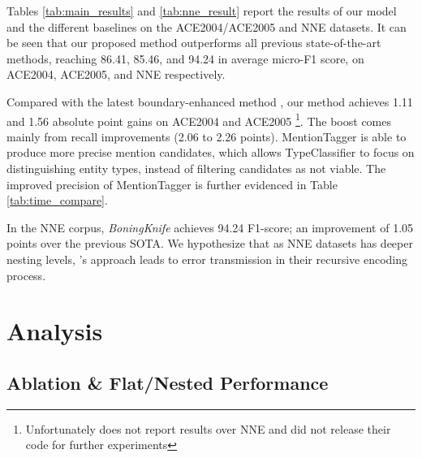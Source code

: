 \documentclass[11pt,a4paper]{article}
\begin{document}
Tables \ref{tab:main_results} and \ref{tab:nne_result} report the results of our model and the different baselines on the ACE2004/ACE2005 and NNE datasets.
It can be seen that our proposed method outperforms all previous state-of-the-art methods, reaching 86.41, 85.46, and 94.24 in average micro-F1 score, on ACE2004, ACE2005, and NNE respectively.

Compared with the latest boundary-enhanced method \citep{tan2020boundary}, our method achieves 1.11 and 1.56 absolute point gains on ACE2004 and ACE2005 \footnote{Unfortunately \citet{tan2020boundary} does not report results over NNE and did not release their code for further experiments}.
The boost comes mainly from recall improvements (2.06 to 2.26 points). MentionTagger is able to produce more precise mention candidates, which allows TypeClassifier to focus on distinguishing entity types, instead of filtering candidates as not viable. The improved precision of MentionTagger is further evidenced in Table \ref{tab:time_compare}.




In the NNE corpus, \textit{BoningKnife} achieves 94.24 F1-score; an improvement of 1.05 points over the previous SOTA. We hypothesize that as NNE datasets has deeper nesting levels, \citep{tan2020boundary}'s approach leads to error transmission in their recursive encoding process.
 
\section{Analysis}
\label{sec:analysis}

\subsection{Ablation \& Flat/Nested Performance}
\label{sec:ablation}
\end{document}
